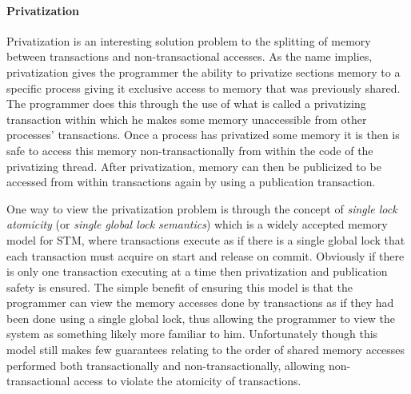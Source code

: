 \paragraph{Privatization}
Privatization is an interesting solution problem to the splitting of memory
between transactions and non-transactional accesses.
As the name implies, privatization gives the programmer the ability
to privatize sections memory to a specific process giving it exclusive access to
memory that was previously shared.
The programmer does this through the use of what is called a privatizing transaction
within which he makes some memory unaccessible from other processes' transactions.
Once a process has privatized some memory it is then is safe
to access this memory non-transactionally from within the code of the privatizing thread.
After privatization, memory can then be publicized to be accessed
from within transactions again
by using a publication transaction.


One way to view the privatization problem is through the concept of
\emph{single lock atomicity} (or \emph{single global lock semantics}) \cite{MBS08} which is a widely
accepted memory model for STM, where transactions execute as if there is 
a single global lock that each transaction must acquire on
start and release on commit.
Obviously if there is only one transaction executing at a time then privatization and publication safety is
ensured.
The simple benefit of ensuring this model is that the programmer can view the memory accesses done by transactions
as if they had been done using a single global lock,
thus allowing the programmer to view the system as something likely more familiar to him.
Unfortunately though this model still makes few guarantees relating to the order
of shared memory accesses performed both transactionally and non-transactionally,
allowing non-transactional access to violate the atomicity of transactions.


